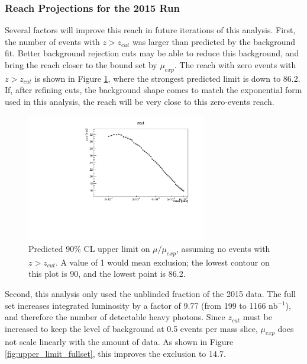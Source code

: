 \subsubsection{Reach Projections for the 2015 Run}
\label{sec:reach_projections}
Several factors will improve this reach in future iterations of this analysis.
First, the number of events with $z>z_{cut}$ was larger than predicted by the background fit.
Better background rejection cuts may be able to reduce this background, and bring the reach closer to the bound set by $\mu_{exp}$.
The reach with zero events with $z>z_{cut}$ is shown in Figure \ref{fig:upper_limit_nosignal}, where the strongest predicted limit is down to 86.2.
If, after refining cuts, the background shape comes to match the exponential form used in this analysis, the reach will be very close to this zero-events reach.

\begin{figure}[ht]
\begin{center}
    \includegraphics[width=0.7\textwidth,page=15,angle=-90]{vertexing/figs/golden_mres_nosignal_output}
\end{center}
\caption{Predicted 90\% CL upper limit on $\mu/\mu_{exp}$, assuming no events with $z>z_{cut}$. A value of 1 would mean exclusion; the lowest contour on this plot is 90, and the lowest point is 86.2.}
    \label{fig:upper_limit_nosignal}
\end{figure}

Second, this analysis only used the unblinded fraction of the 2015 data.
The full set increases integrated luminosity by a factor of 9.77 (from 199 to 1166 nb$^{-1}$), and therefore the number of detectable heavy photons.
Since $z_{cut}$ must be increased to keep the level of background at 0.5 events per mass slice, $\mu_{exp}$ does not scale linearly with the amount of data.
As shown in Figure \ref{fig:upper_limit_fullset}, this improves the exclusion to 14.7.

